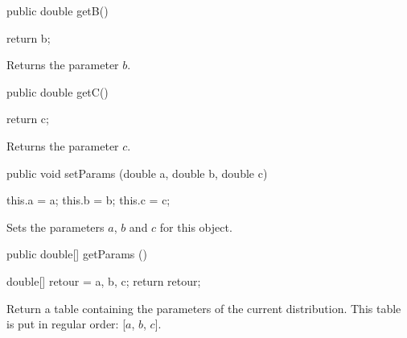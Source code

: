 \begin{code}

   public double getB()\begin{hide} {
      return b;
   }\end{hide}
\end{code}
  \begin{tabb} Returns the parameter $b$.
  \end{tabb}
\begin{htmlonly}
\end{htmlonly}
\begin{code}

   public double getC()\begin{hide} {
      return c;
   }\end{hide}
\end{code}
  \begin{tabb} Returns the parameter $c$.
  \end{tabb}
\begin{htmlonly}
\end{htmlonly}
\begin{code}

   public void setParams (double a, double b, double c)\begin{hide} {
      this.a  = a;
      this.b  = b;
      this.c  = c;
   }\end{hide}
\end{code}
  \begin{tabb} Sets the parameters $a$, $b$ and $c$ for this object.
  \end{tabb}
\begin{htmlonly}
\end{htmlonly}
\begin{code}

   public double[] getParams ()\begin{hide} {
      double[] retour = {a, b, c};
      return retour;
   }\end{hide}
\end{code}
\begin{tabb}
   Return a table containing the parameters of the current distribution.
   This table is put in regular order: [$a$, $b$, $c$].
\end{tabb}
\begin{htmlonly}
   \return{[$a$, $b, $c]}
\end{htmlonly}
